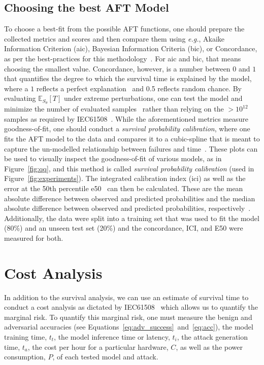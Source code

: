 \documentclass[sn-mathphys-num]{sn-jnl}%
\begin{document}
\subsection{Choosing the best AFT Model}
\label{best-fit}
To choose a best-fit from the possible AFT functions, one should prepare the collected metrics and scores and then compare them using \textit{e.g.}, Akaike Information Criterion (\acrshort{aic}), Bayesian Information Criteria (\acrshort{bic}), or Concordance, as per the best-practices for this methodology~\cite{aft_models,kleinbaum1996survival}. 
For \acrshort{aic} and \acrshort{bic}, that means choosing the smallest value. Concordance, however, is a number between $0$ and $1$ that quantifies the degree to which the survival time is explained by the model, where a $1$ reflects a perfect explanation~\cite{kleinbaum1996survival} and 0.5 reflects random chance. By evaluating $\mathbb{E}_{S_\theta}[T]$ under extreme perturbations, one can test the model and minimize the number of evaluated samples~\cite{aft_models,kleinbaum1996survival} rather than relying on the $> 10^{12}$ samples as required by IEC61508~\cite{IEC61508}. 
While the aforementioned metrics measure goodness-of-fit, one should conduct a \textit{survival probability calibration}, where one fits the AFT model to the data and compares it to a cubic-spline that is meant to capture the un-modelled relationship between failures and time~\cite{ici}. These plots can be used to visually inspect the goodness-of-fit of various models, as in Figure~\ref{fig:qq}, and this method is called \textit{survival probability calibration} (used in Figure~\ref{fig:experiments}).
The integrated calibration index (\acrshort{ici}) as well as the error at the 50th percentile \acrshort{e50}~\cite{ici} can then be calculated. 
These are the mean absolute difference between observed and predicted probabilities and the median absolute difference between observed and predicted probabilities, respectively~\cite{ici}. 
Additionally, the data were split into a training set that was used to fit the model (80\%) and an unseen test set (20\%) and the concordance, ICI, and E50 were measured for both.






\section{Cost Analysis}
\label{cost}

In addition to the survival analysis, we can use an estimate of survival time to conduct a cost analysis as dictated by IEC61508~\cite{IEC61508} which allows us to quantify the marginal risk. To quantify this marginal risk, one must measure the benign and adversarial accuracies (see Equations~\ref{eq:adv_success}~and~\ref{eq:acc}), the model training time, $t_{t}$, the model inference time or latency, $t_{i}$, the attack generation time, $t_{a}$, the cost per hour for a particular hardware, $C$, as well as the power consumption, $P$, of each tested model and attack.
\end{document}
